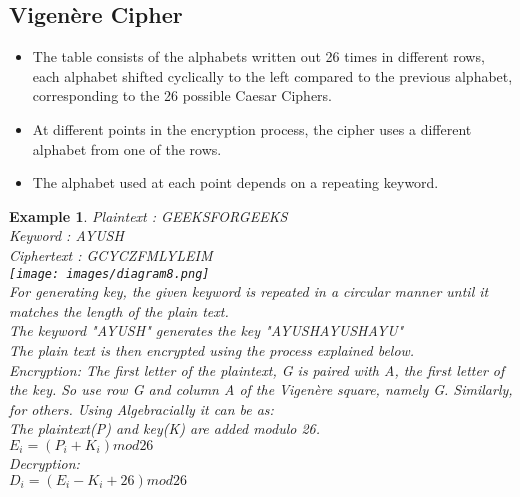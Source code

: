 \documentclass{article}
\newtheorem{ex}{Example}[section]
\begin{document}
\subsection{Vigenère Cipher}
\begin{itemize}
    \item The table consists of the alphabets written out 26 times in different rows, each alphabet shifted cyclically to the left compared to the previous alphabet, corresponding to the 26 possible Caesar Ciphers.
    \item At different points in the encryption process, the cipher uses a different alphabet from one of the rows.
    \item The alphabet used at each point depends on a repeating keyword.
\end{itemize}
\begin{ex}
Plaintext : GEEKSFORGEEKS\\
Keyword : AYUSH\\
Ciphertext : GCYCZFMLYLEIM\\
\texttt{[image: images/diagram8.png]}
\\For generating key, the given keyword is repeated in a circular manner until it matches the length of the plain text.\\
The keyword "AYUSH" generates the key "AYUSHAYUSHAYU"\\
The plain text is then encrypted using the process explained below.
\\Encryption: The first letter of the plaintext, G is paired with A, the first letter of the key. So use row G and column A of the Vigenère square, namely G. Similarly, for others. Using Algebracially it can be as:\\
The plaintext(P) and key(K) are added modulo 26.\\
$E_i = (P_i + K_i) mod 26$
\\
Decryption:\\
$D_i = (E_i - K_i + 26) mod 26$
\end{ex}
\end{document}
